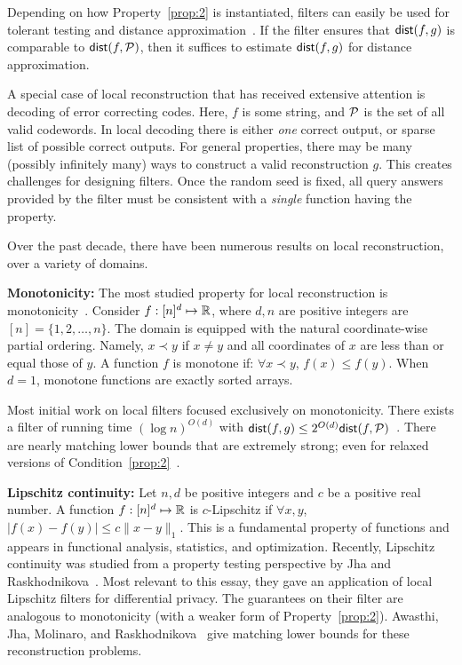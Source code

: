 \documentclass[natbib]{svcyclop}
\def\dist{{\sf dist}}
\begin{document}
Depending on how Property~\ref{prop:2} is instantiated, filters
can easily be used for tolerant testing and distance approximation~\cite{PRR04}. If the filter ensures
that $\dist(f,g)$ is comparable to $\dist(f,\cP)$, then it suffices to estimate $\dist(f,g)$
for distance approximation. 
%

A special case of local reconstruction that has received extensive attention is decoding of error correcting codes. 
Here, $f$ is some string, and $\mathcal{P}$ is the set of all valid codewords. 
In local decoding there is either \emph{one} correct output, or 
sparse list of possible correct outputs. For general properties,
there may be many (possibly infinitely many) ways
to construct a valid reconstruction $g$. This creates challenges
for designing filters. Once the random seed is fixed, all query answers
provided by the filter must be consistent with a {\em single} function
having the property.



\KeyRes

Over the past decade, there have been numerous results on local reconstruction,
over a variety of domains. 

{\bf Monotonicity:} The most studied property for local reconstruction
is monotonicity~\cite{ACCL2,SS06,BhGr+12,AwJh+12}. Consider $f:[n]^d \mapsto \mathbb{R}$,
where $d,n$ are positive integers are $[n] = \{1,2,\ldots,n\}$. The domain
is equipped with the natural coordinate-wise partial ordering. Namely, $x \prec y$
if $x \neq y$ and all coordinates of $x$ are less than or equal those of $y$. A function $f$
is monotone if: $\forall x \prec y$, $f(x) \leq f(y)$. When $d=1$,
monotone functions are exactly sorted arrays.

Most initial work on local filters focused exclusively on monotonicity.
There exists a filter of running
time $(\log n)^{O(d)}$ with $\dist(f,g) \leq 2^{O(d)}\dist(f,\cP)$~\cite{SS06}.
There are nearly matching lower bounds that are extremely strong; even for relaxed versions of Condition~\ref{prop:2}~\cite{AwJh+12}.

{\bf Lipschitz continuity:} Let $n,d$ be positive integers and $c$ be a positive real number. A function $f:[n]^d \mapsto \mathbb{R}$ is $c$-Lipschitz
if $\forall x,y$, $|f(x) - f(y)| \leq c\|x-y\|_1$. This is a fundamental property
of functions and appears in functional analysis, statistics, and optimization.
Recently, Lipschitz continuity was studied from a property testing perspective by Jha and Raskhodnikova~\cite{JhRa13}.
Most relevant to this essay, they gave an application of local Lipschitz filters
for differential privacy. The guarantees on their filter are analogous to monotonicity
(with a weaker form of Property~\ref{prop:2}). Awasthi, Jha, Molinaro, and Raskhodnikova~\cite{AwJh+12}
give matching lower bounds for these reconstruction problems.
%
\end{document}
